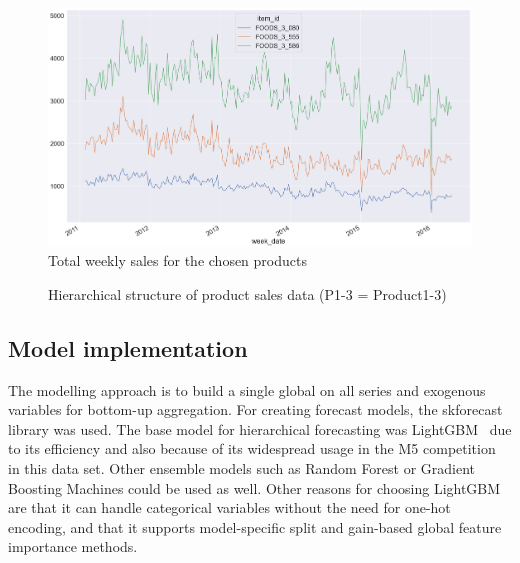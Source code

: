 \begin{figure}
    \centering
    \includegraphics[width=0.8\linewidth]{chapters/05_feature_importance_hierarchy/img/product_sales }
    \centering
    \caption{Total weekly sales for the chosen products}
    \label{fig:product_sales}
\end{figure}


\begin{figure}
    \caption{Hierarchical structure of product sales data (P1-3 = Product1-3)} \label{fig:hierarchical_structure}
\end{figure}




\subsection{Model implementation}\label{subsec:model-implementation}
The modelling approach is to build a single global on all series and exogenous variables for bottom-up aggregation.
For creating forecast models, the skforecast\cite{skforecast} library was used.
The base model for hierarchical forecasting was LightGBM~\cite{guolin_ke_highly_2017}
due to its efficiency and also because of its widespread usage in the M5 competition in this data set\cite{makridakis_m5_2022}.
Other ensemble models such as Random Forest or Gradient Boosting Machines could be used as well.
Other reasons for choosing LightGBM are that it can handle categorical variables without the need for one-hot encoding, and that it supports model-specific split and gain-based global feature importance methods.

